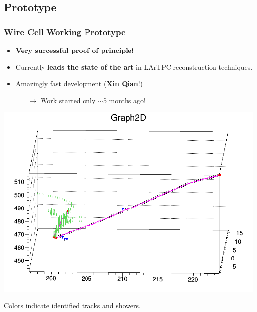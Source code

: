 \documentclass[xcolor=dvipsnames]{beamer}
\begin{document}
\subsection{Prototype}

\begin{frame}
  \frametitle{Wire Cell Working Prototype}
  \footnotesize

  \begin{itemize}
  \item \textbf{Very successful proof of principle!}
  \item Currently \textbf{leads the state of the art} in LArTPC
    reconstruction techniques.
  \item Amazingly fast development (\textbf{Xin Qian}!)
    \begin{itemize}\scriptsize
    \item[$\rightarrow$] Work started only $\sim$5 months ago!
    \end{itemize}
  \end{itemize}

  \begin{center}
    \includegraphics[height=0.5\textheight,trim=0cm 0cm 0cm 2cm,clip]{xin-shower.png}

    \scriptsize
    Colors indicate identified tracks and showers.
  \end{center}

\end{frame}
\end{document}
